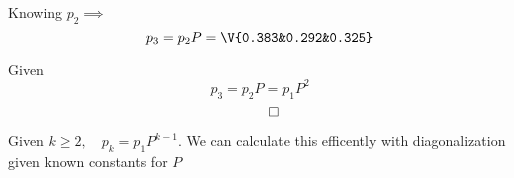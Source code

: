 \documentclass[12pt]{amsart}
\begin{document}
  \begin{problem}
    Knowing $p_2 \implies$
    \[p_3=p_2P=\V{0.383&0.292&0.325} \]
  \end{problem}

  \begin{problem}
    Given 
    \[p_3 = p_2 P = p_1 P^2\] 
    \[ \qed\]
  \end{problem}
  
  \begin{problem}
    Given $k\geq2,\quad p_k = p_1P^{k-1}$. We can calculate this efficently with diagonalization given known constants for $P$
  \end{problem}
\end{document}
